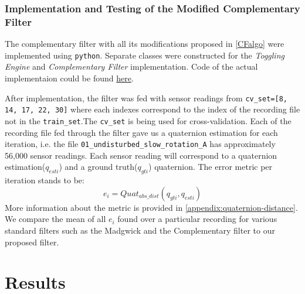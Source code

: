 \documentclass{iutbscthesis}
\begin{document}
\subsection{Implementation and Testing of the Modified Complementary Filter} \label{section:impl-and-testing}
The complementary filter with all its modifications proposed in \autoref{CFalgo} were implemented using \texttt{python}. Separate classes were constructed for the \textit{Toggling Engine} and \textit{Complementary Filter} implementation. Code of the actual implementaion could be found \href{https://github.com/azfarus/NDAG_MARG_THESIS_v2}{here}.
\par
After implementation, the filter was fed with sensor readings from  \texttt{cv\_set=[8, 14, 17, 22, 30]}\label{cv_set} where each indexes correspond to the index of the recording file not in the \texttt{train\_set}.The \texttt{cv\_set} is being used for cross-validation. Each of the recording file fed through the filter gave us a quaternion estimation for each iteration, i.e. the file \texttt{01\_undisturbed\_slow\_rotation\_A} has approximately 56,000 sensor readings. Each sensor reading will correspond to a quaternion estimation($q_{esti}$) and a ground truth($q_{gti}$) quaternion. The error metric per iteration stands to be:
\begin{equation}
    e_i = Quat_{abs\_dist}(q_{gti},q_{esti})
\end{equation}
More information about the metric is provided in \autoref{appendix:quaternion-distance}. We compare the mean of all $e_i$ found over a particular recording for various standard filters such as the Madgwick and the Complementary filter to our proposed filter.






\chapter{Results} \label{chapter:results}
\end{document}
